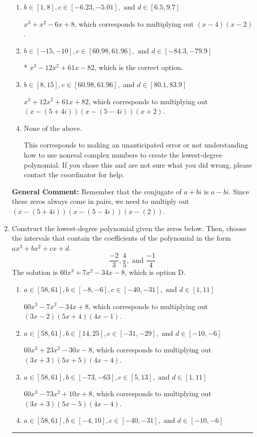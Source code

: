 \documentclass{extbook}[14pt]
\newcommand{\litem}[1]{\item #1

\rule{\textwidth}{0.4pt}}
\begin{document}
\begin{enumerate}
{\begin{enumerate}[label=\Alph*.]
$x^{3} + x^{2} -7 x + 10$, which corresponds to multiplying out $(x -5)(x -2)$.
\item \( b \in [1, 8], c \in [-6.23, -5.01], \text{ and } d \in [6.5, 9.7] \)

$x^{3} + x^{2} -6 x + 8$, which corresponds to multiplying out $(x -4)(x -2)$.
\item \( b \in [-15, -10], c \in [60.98, 61.96], \text{ and } d \in [-84.3, -79.9] \)

* $x^{3} -12 x^{2} +61 x -82$, which is the correct option.
\item \( b \in [8, 15], c \in [60.98, 61.96], \text{ and } d \in [80.1, 83.9] \)

$x^{3} +12 x^{2} +61 x + 82$, which corresponds to multiplying out $(x-(5 + 4 i))(x-(5 - 4 i))(x + 2)$.
\item \( \text{None of the above.} \)

This corresponds to making an unanticipated error or not understanding how to use nonreal complex numbers to create the lowest-degree polynomial. If you chose this and are not sure what you did wrong, please contact the coordinator for help.
\end{enumerate}

\textbf{General Comment:} Remember that the conjugate of $a+bi$ is $a-bi$. Since these zeros always come in pairs, we need to multiply out $(x-(5 + 4 i))(x-(5 - 4 i))(x-(2))$.
}
\litem{
Construct the lowest-degree polynomial given the zeros below. Then, choose the intervals that contain the coefficients of the polynomial in the form $ax^3+bx^2+cx+d$.
\[ \frac{-2}{3}, \frac{4}{5}, \text{ and } \frac{-1}{4} \]
The solution is \( 60x^{3} +7 x^{2} -34 x -8 \), which is option D.\begin{enumerate}[label=\Alph*.]
\item \( a \in [58, 61], b \in [-8, -6], c \in [-40, -31], \text{ and } d \in [1, 11] \)

$60x^{3} -7 x^{2} -34 x + 8$, which corresponds to multiplying out $(3x -2)(5x + 4)(4x -1)$.
\item \( a \in [58, 61], b \in [14, 25], c \in [-31, -29], \text{ and } d \in [-10, -6] \)

$60x^{3} +23 x^{2} -30 x -8$, which corresponds to multiplying out $(3x + 3)(5x + 5)(4x -4)$.
\item \( a \in [58, 61], b \in [-73, -63], c \in [5, 13], \text{ and } d \in [1, 11] \)

$60x^{3} -73 x^{2} +10 x + 8$, which corresponds to multiplying out $(3x + 3)(5x -5)(4x -4)$.
\item \( a \in [58, 61], b \in [-4, 10], c \in [-40, -31], \text{ and } d \in [-10, -6] \)


\end{enumerate}}
\end{enumerate}
\end{document}
